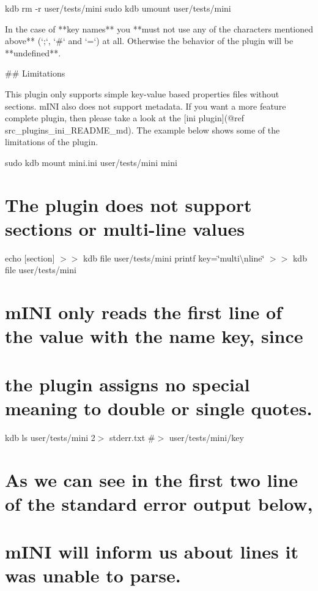 kdb rm -\/r user/tests/mini sudo kdb umount user/tests/mini 
\begin{DoxyCode}
In the case of **key names** you **must not use any of the characters mentioned above** (`;`, `#` and `=`)
       at all. Otherwise the behavior of the plugin will be **undefined**.

## Limitations

This plugin only supports simple key-value based properties files without sections. mINI also does not
       support metadata. If you want a more feature complete plugin, then please take a look at the [ini plugin](@ref
       src\_plugins\_ini\_README\_md). The example below shows some of the limitations of the plugin.
\end{DoxyCode}
 sudo kdb mount mini.\+ini user/tests/mini mini

\section*{The plugin does not support sections or multi-\/line values}

echo \textquotesingle{}\mbox{[}section\mbox{]}\textquotesingle{} $>$$>$ {\ttfamily kdb file user/tests/mini} printf \textquotesingle{}key=\char`\"{}multi\textbackslash{}nline\char`\"{}\textquotesingle{} $>$$>$ {\ttfamily kdb file user/tests/mini}

\section*{m\+I\+NI only reads the first line of the value with the name {\ttfamily key}, since}

\section*{the plugin assigns no special meaning to double or single quotes.}

kdb ls user/tests/mini 2$>$ stderr.\+txt \#$>$ user/tests/mini/key

\section*{As we can see in the first two line of the standard error output below,}

\section*{m\+I\+NI will inform us about lines it was unable to parse.}

